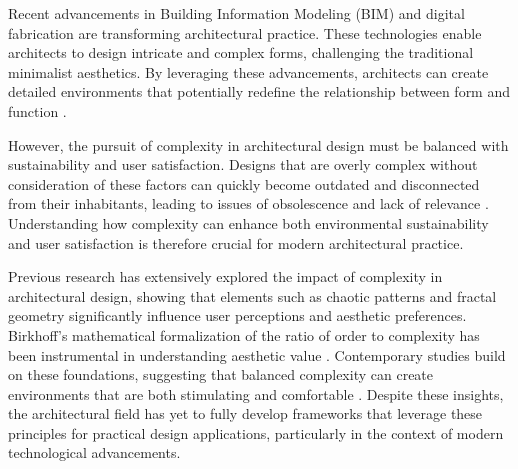 




Recent advancements in Building Information Modeling (BIM) and digital fabrication are transforming architectural practice.
These technologies enable architects to design intricate and complex forms, challenging the traditional minimalist aesthetics.
By leveraging these advancements, architects can create detailed environments that potentially redefine the relationship between form and function \cite{Gage2015}.

However, the pursuit of complexity in architectural design must be balanced with sustainability and user satisfaction.
Designs that are overly complex without consideration of these factors can quickly become outdated and disconnected from their inhabitants, leading to issues of obsolescence and lack of relevance \cite{Aesthetic2022}.
Understanding how complexity can enhance both environmental sustainability and user satisfaction is therefore crucial for modern architectural practice.


Previous research has extensively explored the impact of complexity in architectural design, showing that elements such as chaotic patterns and fractal geometry significantly influence user perceptions and aesthetic preferences\cite{Bies2016}.
Birkhoff's mathematical formalization of the ratio of order to complexity has been instrumental in understanding aesthetic value \cite{Birkhoff1933}.
Contemporary studies build on these foundations, suggesting that balanced complexity can create environments that are both stimulating and comfortable \cite{Redies2015}.
Despite these insights, the architectural field has yet to fully develop frameworks that leverage these principles for practical design applications, particularly in the context of modern technological advancements.

